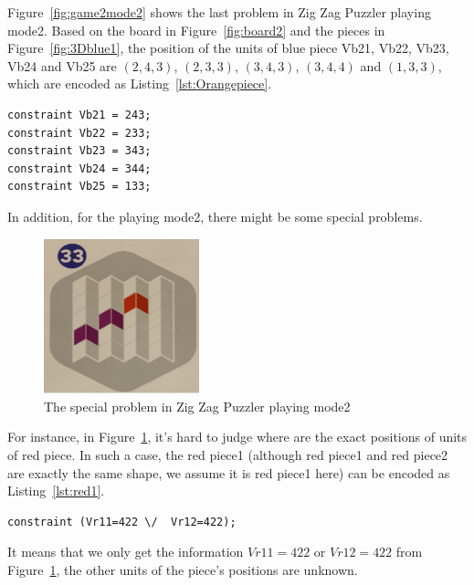 \bigskip
\smallbreak
Figure~\ref{fig:game2mode2} shows the last problem in Zig Zag Puzzler playing mode2. Based on the board in Figure~\ref{fig:board2} and the pieces in Figure~\ref{fig:3Dblue1}, the position of the units of blue piece Vb21, Vb22, Vb23, Vb24 and Vb25 are $(2,4,3)$, $(2,3,3)$, $(3,4,3)$, $(3,4,4)$ and $(1,3,3)$, which are encoded as Listing~\ref{lst:Orangepiece}.
\begin{lstlisting}[language=minizinc,numbers=none,caption={Encoding for blue piece2's position of last problem in playing mode2},label={lst:Orangepiece}]
constraint Vb21 = 243;
constraint Vb22 = 233;
constraint Vb23 = 343;
constraint Vb24 = 344;
constraint Vb25 = 133;
\end{lstlisting}
\bigskip
\smallbreak
In addition, for the playing mode2, there might be some special problems.
\begin{figure}[htbp]
    \centering
    \includegraphics[width=0.4\textwidth]{figs/specialcase.jpg}
    \caption{The special problem in Zig Zag Puzzler playing mode2}
    \label{fig:specialcase}
\end{figure}
For instance, in Figure~\ref{fig:specialcase}, it's hard to judge where are the exact positions of units of red piece. In such a case, the red piece1 (although red piece1 and red piece2 are exactly the same shape, we assume it is red piece1 here) can be encoded as Listing~\ref{lst:red1}.
\begin{lstlisting}[language=minizinc,numbers=none,caption={Encoding for red piece1's position of special problem},label={lst:red1}]
constraint (Vr11=422 \/  Vr12=422);
\end{lstlisting}
\bigskip
\smallbreak
It means that we only get the information $Vr11=422$ or $Vr12=422$ from Figure~\ref{fig:specialcase}, the other units of the piece's positions are unknown.
